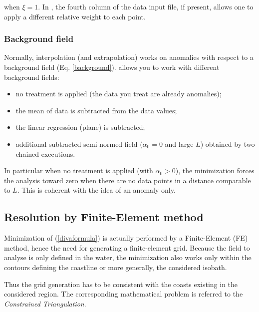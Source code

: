 when $\xi=1$. In  \diva, the fourth column of the data input file, if present, allows one 
to apply a different relative weight to each point. 


\subsubsection{Background field\label{sec:backgroundfield}}

Normally, interpolation (and extrapolation) works on anomalies with respect to a background field (Eq. \ref{background}). \diva allows you to work with different background fields:

\begin{itemize}
\item no treatment is applied (the data you treat are already anomalies);
\item the mean of data is subtracted from the data values;
\item the linear regression (plane) is subtracted;
\item additional subtracted semi-normed field ($\alpha_0=0$ and large $L$) obtained by two chained \diva executions. %
\end{itemize}

In particular when no treatment is applied (with $\alpha_0 > 0$), the minimization forces the analysis toward zero when there are no
data points in a distance comparable to $L$. This is coherent with the idea of an anomaly only.

\subsection{Resolution by Finite-Element method\label{sec:finiteelements}}

Minimization of (\ref{divaformula}) is actually performed by a Finite-Element (FE) method, hence the need for generating a finite-element grid. 
Because the field to analyse is only defined in the water, the minimization also works only within the contours defining the coastline or more generally, the considered isobath.

Thus the grid generation has to be consistent with the coasts existing in the considered region. The corresponding mathematical problem is referred to the \textit{Constrained Triangulation}. %

